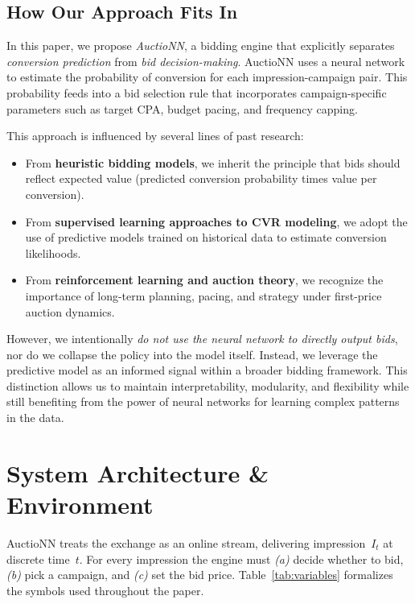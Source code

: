 \documentclass[11pt]{article}
\begin{document}
\subsection{How Our Approach Fits In}

In this paper, we propose \emph{AuctioNN}, a bidding engine that explicitly separates \emph{conversion prediction} from \emph{bid decision-making}. AuctioNN uses a neural network to estimate the probability of conversion for each impression-campaign pair. This probability feeds into a bid selection rule that incorporates campaign-specific parameters such as target CPA, budget pacing, and frequency capping.

This approach is influenced by several lines of past research:

\begin{itemize}
    \item From \textbf{heuristic bidding models}, we inherit the principle that bids should reflect expected value (predicted conversion probability times value per conversion).
    \item From \textbf{supervised learning approaches to CVR modeling}, we adopt the use of predictive models trained on historical data to estimate conversion likelihoods.
    \item From \textbf{reinforcement learning and auction theory}, we recognize the importance of long-term planning, pacing, and strategy under first-price auction dynamics.
\end{itemize}

However, we intentionally \emph{do not use the neural network to directly output bids}, nor do we collapse the policy into the model itself. Instead, we leverage the predictive model as an informed signal within a broader bidding framework. This distinction allows us to maintain interpretability, modularity, and flexibility while still benefiting from the power of neural networks for learning complex patterns in the data.

\section{System Architecture \& Environment}\label{sec:env}

AuctioNN treats the exchange as an online stream, delivering
impression~$I_t$ at discrete time~$t$.
For every impression the engine must
\emph{(a)} decide whether to bid,
\emph{(b)} pick a campaign, and
\emph{(c)} set the bid price.
Table~\ref{tab:variables} formalizes the symbols used throughout the paper.
\end{document}
